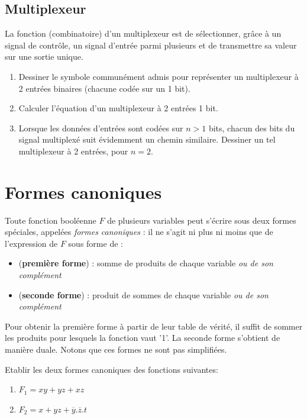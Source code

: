 \documentclass[a4paper,11pt]{article}
\begin{document}
\subsection{Multiplexeur}
La fonction (combinatoire) d'un multiplexeur est de sélectionner, grâce à un signal de contrôle, un signal d'entrée parmi plusieurs et de transmettre sa valeur sur une sortie unique.
\begin{enumerate}
\item Dessiner le symbole communément admis pour représenter un multiplexeur à 2 entrées binaires (chacune codée sur un 1 bit).
\item Calculer l'équation d'un multiplexeur à 2 entrées 1 bit.
\item Lorsque les données d'entrées sont codées sur $n>1$ bits, chacun des bits du signal multiplexé suit évidemment un chemin similaire. Dessiner un tel multiplexeur à 2 entrées, pour $n=2$.
\end{enumerate}


\section{Formes canoniques}

Toute fonction booléenne $F$ de plusieurs variables peut s'écrire sous deux formes spéciales, appelées {\it formes canoniques} : il ne s'agit ni plus ni moins que de l'expression de $F$ sous forme de :
\begin{itemize}
\item ({\bf première forme}) : somme de produits de chaque variable {\it ou de son complément}
\item ({\bf seconde forme}) : produit de sommes de chaque variable {\it ou de son complément}
\end{itemize}

Pour obtenir la première forme à partir de leur table de vérité, il suffit de sommer les produits pour lesquels la fonction vaut '1'. La seconde forme s'obtient de manière duale. Notons que ces formes ne sont pas simplifiées.

Etablir les deux formes canoniques des fonctions suivantes:

\begin{enumerate}
\item $F_1=xy+yz+xz$
\item $F_2=x+yz+\overline{y}.\overline{z}.t$
\end{enumerate}
\end{document}
